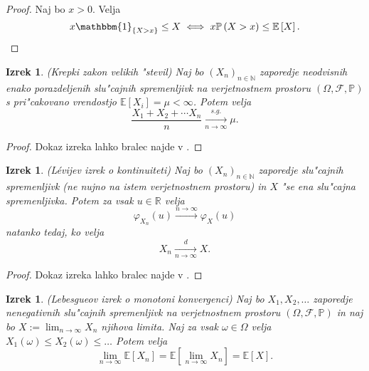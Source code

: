 \documentclass[12pt, a4paper, reqno]{amsart}
\theoremstyle{definition}
\theoremstyle{plain}
\newtheorem{izrek}[definicija]{Izrek}
\newcommand{\R}{\mathbb{R}}
\newcommand{\N}{\mathbb{N}}
\newcommand{\E}{\mathbb{E}}
\newcommand{\Prob}{\mathbb{P}}
\newcommand{\1}{\mathds{1}}
\begin{document}
    \begin{proof}
        Naj bo $x > 0$. Velja
        \begin{equation*}
            x\mathbbm{1}_{\{X > x\}} \leq X \iff x\Prob\left(X > x\right) \leq \E\left[X\right].
        \end{equation*}
    \end{proof}

    \begin{izrek}(Krepki zakon velikih "stevil)
        Naj bo $(X_n)_{n\in\N}$ zaporedje neodvisnih enako porazdeljenih
        slu"cajnih spremenljivk na verjetnostnem prostoru $(\Omega, \mathcal{F}, \Prob)$
         s pri"cakovano vrendostjo $\E\left[X_i\right] = \mu <\infty$. Potem velja
        \begin{equation*}
            \frac{X_1 + X_2 + \cdots X_n}{n}\xrightarrow[n\to\infty]{s.g.} \mu.
        \end{equation*}
        \label{izr:KrepkiZakonVelikihStevil}
    \end{izrek}

    \begin{proof}
        Dokaz izreka lahko bralec najde v \cite{7}.
    \end{proof}

    \begin{izrek}(Lévijev izrek o kontinuiteti)
        Naj bo $(X_n)_{n\in\N}$ zaporedje slu"cajnih spremenljivk (ne nujno na istem verjetnostnem prostoru)
        in $X$ "se ena slu"cajna spremenljivka. Potem za vsak $u\in\R$ velja
        \begin{equation*}
            \varphi_{X_n}(u) \xrightarrow{n\to\infty} \varphi_X(u) 
        \end{equation*}
        natanko tedaj, ko velja
        \begin{equation*}
            X_n \xrightarrow[n\to\infty]{d} X.
        \end{equation*}
        \label{izr:LevijevIzrek}
    \end{izrek}

    \begin{proof}
        Dokaz izreka lahko bralec najde v \cite{7}.
    \end{proof}

    \begin{izrek}(Lebesgueov izrek o monotoni konvergenci)
        Naj bo $X_1, X_2, \dots $ zaporedje nenegativnih slu"cajnih spremenljivk na 
        verjetnostnem prostoru $(\Omega, \mathcal{F}, \Prob)$ in naj bo $X:= \lim_{n\to\infty}X_n$ 
        njihova limita. Naj za vsak $\omega \in \Omega$
        velja $X_1(\omega) \leq X_2(\omega) \leq \dots$ Potem velja 
        \begin{equation*}
            \lim_{n\to\infty}\E\left[X_n\right] = \E\left[\lim_{n\to\infty}X_n\right] = \E\left[X\right].
        \end{equation*}
        \label{izr:monotonaKonvergenca}
    \end{izrek}
\end{document}
